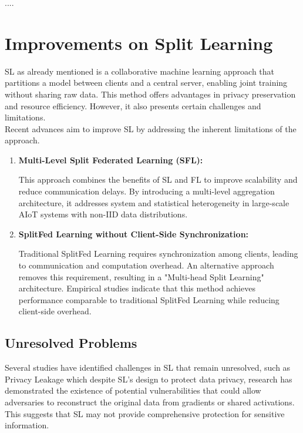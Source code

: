 ....

\section{Improvements on Split Learning}
\label{sec:improvements_on_sl}

\gls{SL} as already mentioned is a collaborative machine learning approach that partitions a model between clients and a central server, enabling joint training without sharing raw data. This method offers advantages in privacy preservation and resource efficiency. However, it also presents certain challenges and limitations.
	\\
	Recent advances aim to improve \gls{SL} by addressing the inherent limitations of the approach.

\begin{enumerate}

	\item \textbf{Multi-Level Split Federated Learning (\gls{SFL}):} 
	
	This approach combines the benefits of \gls{SL} and \gls{FL} to improve scalability and reduce communication delays. By introducing a multi-level aggregation architecture, it addresses system and statistical heterogeneity in large-scale AIoT systems with non-IID data distributions.
	
	\item \textbf{SplitFed Learning without Client-Side Synchronization:}
	 
	Traditional SplitFed Learning requires synchronization among clients, leading to communication and computation overhead. An alternative approach removes this requirement, resulting in a "Multi-head Split Learning" architecture. Empirical studies indicate that this method achieves performance comparable to traditional SplitFed Learning while reducing client-side overhead. 

\end{enumerate}

\subsection{Unresolved Problems}
\label{sec:sl_unresolved_problems}

Several studies have identified challenges in SL that remain unresolved, such as Privacy Leakage which despite \gls{SL}'s design to protect data privacy, research has demonstrated the existence of potential vulnerabilities that could allow adversaries to reconstruct the original data from gradients or shared activations. This suggests that \gls{SL} may not provide comprehensive protection for sensitive information.

